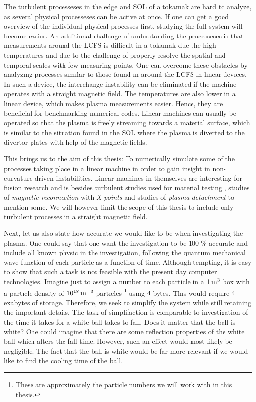 The turbulent processeses in the edge and SOL of a tokamak are hard to analyze, as several physical processeses can be active at once.
If one can get a good overview of the individual physical processes first, studying the full system will become easier.
An additional challenge of understanding the processeses is that measurements around the LCFS is difficult in a tokamak due the high temperatures and due to the challenge of properly resolve the spatial and temporal scales with few measuring points.
One can overcome these obstacles by analyzing processes similar to those found in around the LCFS in linear devices.
In such a device, the interchange instability can be eliminated if the machine operates with a straight magnetic field.
The temperatures are also lower in a linear device, which makes plasma measurements easier.
Hence, they are beneficial for benchmarking numerical codes.
Linear machines can usually be operated so that the plasma is freely streaming towards a material surface, which is similar to the situation found in the SOL where the plasma is diverted to the divertor plates with help of the magnetic fields.

This brings us to the aim of this thesis:
To numerically simulate some of the processes taking place in a linear machine in order to gain insight in non-curvature driven instabilities.
Linear machines in themselves are interesting for fusion research and is besides turbulent studies used for material testing \cite{Rapp2010}, studies of \emph{magnetic reconnection} with \emph{X-points} \cite{Bohlin2014} and studies of \emph{plasma detachment} \cite{Ohno2017} to mention some.
We will however limit the scope of this thesis to include only turbulent processes in a straight magnetic field.

Next, let us also state how accurate we would like to be when investigating the plasma.
One could say that one want the investigation to be $100 \;\%$ accurate and include all known physic in the investigation, following the quantum mechanical wave-function of each particle as a function of time.
Although tempting, it is easy to show that such a task is not feasible with the present day computer technologies.
Imagine just to assign a number to each particle in a $1\, \text{m}^3$ box with a particle density of $10^{18} \, \text{m}^{-3}$ particles%
%
\footnote{These are approximately the particle numbers we will work with in this thesis.}
%
using $4$ bytes.
This would require $4$ exabytes of storage.
Therefore, we seek to simplify the system while still retaining the important details.
The task of simplifaction is comparable to investigation of the time it takes for a white ball takes to fall.
Does it matter that the ball is white?
One could imagine that there are some reflection properties of the white ball which alters the fall-time.
However, such an effect would most likely be negligible.
The fact that the ball is white would be far more relevant if we would like to find the cooling time of the ball.


